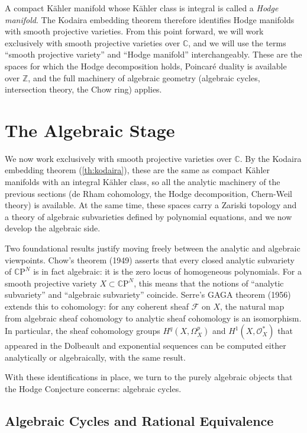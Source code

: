 \documentclass{article}
\newcommand{\C}{\mathbb{C}}
\newcommand{\Z}{{\mathbb{Z}}}
\newcommand{\CO}{\mathcal{O}}
\newcommand{\CP}{\mathbb{C}\mathrm{P}}
\newcommand{\SF}{\mathscr{F}}
\begin{document}
A compact K\"{a}hler manifold whose K\"{a}hler class is integral is called a
\emph{Hodge manifold}. The Kodaira embedding theorem therefore identifies
Hodge manifolds with smooth projective varieties. From this point forward,
we will work exclusively with smooth projective varieties over $\C$, and we
will use the terms ``smooth projective variety'' and ``Hodge manifold''
interchangeably. These are the spaces for which the Hodge decomposition holds,
Poincar\'{e} duality is available over $\Z$, and the full machinery of
algebraic geometry (algebraic cycles, intersection theory, the Chow ring)
applies.



\section{The Algebraic Stage}\label{sec:algebraic}


We now work exclusively with smooth projective varieties over $\C$. By the
Kodaira embedding theorem (\ref{th:kodaira}), these are the same as compact
K\"{a}hler manifolds with an integral K\"{a}hler class, so all the analytic
machinery of the previous sections (de Rham cohomology, the Hodge
decomposition, Chern-Weil theory) is available. At the same time, these spaces
carry a Zariski topology and a theory of algebraic subvarieties defined by
polynomial equations, and we now develop the algebraic side.

Two foundational results justify moving freely between the analytic and
algebraic viewpoints. Chow's theorem (1949) asserts that every closed analytic
subvariety of $\CP^N$ is in fact algebraic: it is the zero locus of
homogeneous polynomials. For a smooth projective variety $X \subset \CP^N$,
this means that the notions of ``analytic subvariety'' and ``algebraic
subvariety'' coincide. Serre's GAGA theorem (1956) extends this to cohomology:
for any coherent sheaf $\SF$ on $X$, the natural map from algebraic sheaf
cohomology to analytic sheaf cohomology is an isomorphism. In particular, the
sheaf cohomology groups $H^q(X, \Omega^p_X)$ and $H^1(X, \CO_X^*)$ that
appeared in the Dolbeault and exponential sequences can be computed either
analytically or algebraically, with the same result.

With these identifications in place, we turn to the purely algebraic objects
that the Hodge Conjecture concerns: algebraic cycles.

\subsection{Algebraic Cycles and Rational Equivalence}\label{subsec:cycles}
\end{document}
